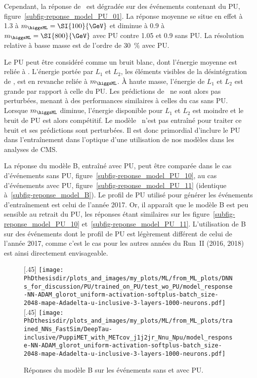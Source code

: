 \par
Cependant, la réponse de \Bnpu\ est dégradée sur des événements contenant du PU, figure~\ref{subfig-reponse_model_PU_01}.
La réponse moyenne se situe en effet à \num{1.3} à $m_{\higgsML}=\SI{100}{\GeV}$ et diminue à \num{0.9} à $m_{\higgsML}=\SI{800}{\GeV}$ avec PU contre \num{1.05} et \num{0.9} sans PU.
La résolution relative à basse masse est de l'ordre de \SI{30}{\%} avec PU.
\par
Le PU peut être considéré comme un bruit blanc, dont l'énergie moyenne est reliée à \Npu.
L'énergie portée par $L_1$ et $L_2$, les éléments visibles de la désintégration de \higgsML,
est en revanche reliée à $m_{\higgsML}$.
À haute masse, l'énergie de $L_1$ et $L_2$ est grande par rapport à celle du PU.
Les prédictions de \Bnpu\ ne sont alors pas perturbées,
menant à des performances similaires à celles du cas sans PU.
Lorsque $m_{\higgsML}$ diminue,
l'énergie disponible pour $L_1$ et $L_2$ est moindre
et
le bruit de PU est alors compétitif.
Le modèle \Bnpu\ n'est pas entraîné pour traiter ce bruit et ses prédictions sont perturbées.
Il est donc primordial d'inclure le PU dans l'entraînement dans l'optique d'une utilisation de nos modèles dans les analyses de CMS.
\par
La réponse du modèle B, entraîné avec PU, peut être comparée
dans le cas d'événements sans PU, figure~\ref{subfig-reponse_model_PU_10},
au cas d'événements avec PU, figure~\ref{subfig-reponse_model_PU_11} (identique à~\ref{subfig-reponse_model_B}).
Le profil de PU utilisé pour générer les événements d'entraînement est celui de l'année 2017.
Or, il apparaît que le modèle B est peu sensible au retrait du PU, les réponses étant similaires sur les figure~\ref{subfig-reponse_model_PU_10} et~\ref{subfig-reponse_model_PU_11}.
L'utilisation de B sur des événements dont le profil de PU est légèrement différent de celui de l'année 2017,
comme c'est le cas pour les autres années du Run~II (2016, 2018)
est ainsi directement envisageable.
\begin{figure}[h]
\centering

[.45\textwidth]
{\texttt{[image: \\PhDthesisdir/plots\_and\_images/my\_plots/ML/from\_ML\_plots/DNNs\_for\_discussion/PU/trained\_on\_PU/test\_wo\_PU/model\_response-NN-ADAM\_glorot\_uniform-activation-softplus-batch\_size-2048-mape-Adadelta-u-inclusive-3-layers-1000-neurons.pdf]}\vspace{-.5\baselineskip}}
\hfill
{}[.45\textwidth]
{\texttt{[image: \\PhDthesisdir/plots\_and\_images/my\_plots/ML/from\_ML\_plots/trained\_NNs\_FastSim/DeepTau-inclusive/PuppiMET\_with\_METcov\_j1j2jr\_Nnu\_Npu/model\_response-NN-ADAM\_glorot\_uniform-activation-softplus-batch\_size-2048-mape-Adadelta-u-inclusive-3-layers-1000-neurons.pdf]}\vspace{-.5\baselineskip}}

\caption{Réponses du modèle B sur les événements sans et avec PU.}
\label{fig-reponse_model_1PU}
\end{figure}
